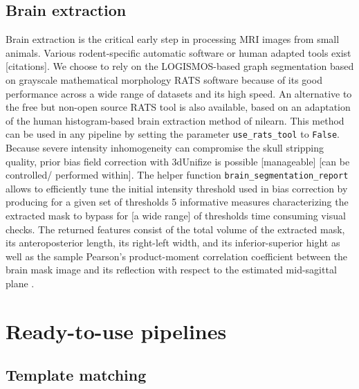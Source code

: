\documentclass[utf8, a4paper, final, crop]{frontiersSCNS} %
\newcommand{\pythoninline}[1]{\texttt{#1}}
\begin{document}
\subsection{Brain extraction}

Brain extraction is the critical early step in processing
MRI images from small animals. Various rodent-specific 
automatic software or human adapted tools exist [citations].
We choose to rely on
the LOGISMOS-based graph segmentation \citep{yin2010logimos} based on grayscale mathematical morphology 
RATS software  \citep{oguz2014rats} because
of its good performance across a wide range of datasets and its high 
speed.
An alternative to the free but non-open source RATS tool is also 
available, based on an adaptation of the 
human histogram-based brain extraction method of nilearn. 
This method can be used in any pipeline by setting the parameter
 \pythoninline{use_rats_tool} to \pythoninline{False}.
Because severe intensity inhomogeneity can compromise
the skull stripping quality, prior bias field correction with
3dUnifize
is possible [manageable] [can be controlled/ performed within].
The helper function \pythoninline{brain_segmentation_report} allows to
efficiently tune the initial intensity threshold used in bias correction by
producing for a given set of thresholds 5 informative measures
characterizing the extracted mask to bypass for [a wide range] of thresholds time 
consuming visual checks.
The returned features %
consist of the total volume of
the extracted mask, its 
anteroposterior length, its right-left width, and its inferior-superior hight as well
as the sample Pearson's product-moment correlation
coefficient between the brain mask image and its reflection
with respect to the estimated mid-sagittal plane
\citep{powell2016fully}.

\section{Ready-to-use pipelines}

\subsection{Template matching}
\end{document}
